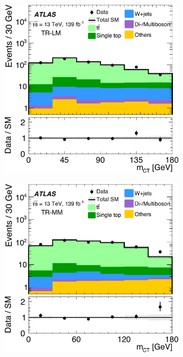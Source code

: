  \begin{figure}
	\centering
	\begin{subfigure}[b]{0.5\linewidth}
		\centering\includegraphics[width=0.85\textwidth]{fig_02a_yellow.pdf}
	\end{subfigure}\hfill
	\begin{subfigure}[b]{0.5\linewidth}
		\centering\includegraphics[width=0.85\textwidth]{fig_02b_yellow}
	\end{subfigure}\hfill
	\par\medskip
	\begin{subfigure}[b]{0.5\linewidth}

\end{subfigure}
\end{figure}
